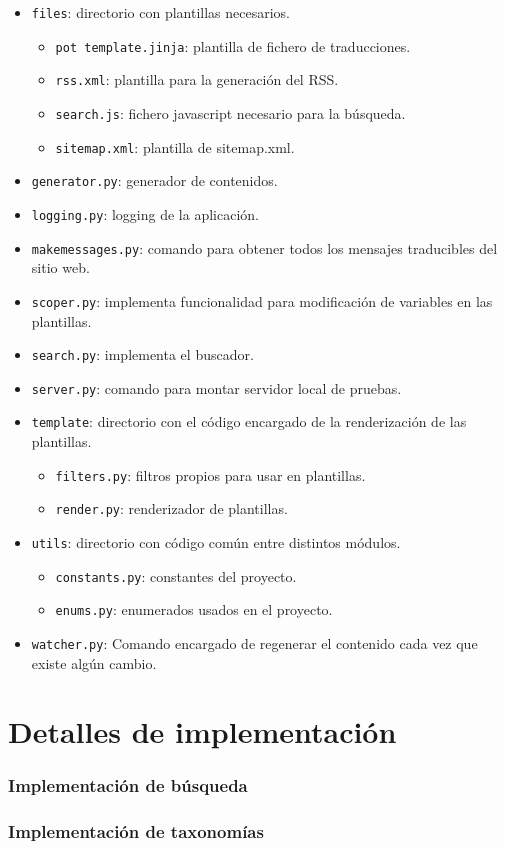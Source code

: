\begin{itemize}
\item \texttt{files}: directorio con plantillas necesarios.
    \begin{itemize}
        \item \texttt{pot template.jinja}: plantilla de fichero de traducciones.
       \item \texttt{rss.xml}: plantilla para la generación del RSS.
       \item \texttt{search.js}: fichero javascript necesario para la búsqueda.
       \item \texttt{sitemap.xml}: plantilla de sitemap.xml.
    \end{itemize}

\item \texttt{generator.py}: generador de contenidos.
\item \texttt{logging.py}: logging de la aplicación.
\item \texttt{makemessages.py}: comando para obtener todos los mensajes traducibles del sitio web.
\item \texttt{scoper.py}: implementa funcionalidad para modificación de variables en las plantillas.
\item \texttt{search.py}: implementa el buscador.
\item \texttt{server.py}: comando para montar servidor local de pruebas.
\item \texttt{template}: directorio con el código encargado de la renderización de las plantillas.
    \begin{itemize}
        \item \texttt{filters.py}: filtros propios para usar en plantillas.
       \item \texttt{render.py}: renderizador de plantillas.
    \end{itemize}

\item \texttt{utils}: directorio con código común entre distintos módulos.
    \begin{itemize}
        \item \texttt{constants.py}: constantes del proyecto.
       \item \texttt{enums.py}: enumerados usados en el proyecto.
    \end{itemize}

\item \texttt{watcher.py}: Comando encargado de regenerar el contenido cada vez que existe algún cambio.
\end{itemize}


\section{Detalles de implementación}

\subsubsection{Implementación de búsqueda}

\subsubsection{Implementación de taxonomías}
